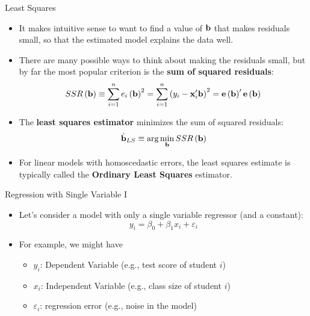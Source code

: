 \begin{frame}{Least Squares}
\begin{itemize}
	\item It makes intuitive sense to want to find a value of ${\bf b}$
	 that makes residuals small, so that the estimated model explains the data well.

	\smallskip
	\item There are many possible ways to think about making the residuals small, but
	by far the most popular criterion is the {\bf sum of squared residuals}:\[
		SSR\left({\bf b}\right) \equiv \sum_{i=1}^{n} e_i \left({\bf b}\right)^2  =  \sum_{i=1}^{n} \left(y_i - {\bf x}_i' {\bf b}\right)^{2} = {\bf e} \left({\bf b}\right) '  {\bf e} \left({\bf b}\right)
	\]

	\smallskip
	\item The {\bf least squares estimator} minimizes the sum of squared residuals:\[
		\hat{{\bf b}}_{LS} \equiv \arg \min_{{\bf b}} SSR\left({\bf b}\right) 
	\]

	\smallskip
	\item For linear models with homoscedastic errors, the least squares estimate is typically called the
	{\bf Ordinary Least Squares} estimator.

\end{itemize}
\end{frame}



\begin{frame}{Regression with Single Variable I}
	\begin{itemize}
	
	\item Let's consider a model with only a single variable regressor (and a constant):\[
	y_i = \beta_0 + \beta_1 x_i + \varepsilon_i
	\]

	\medskip
	\item For example, we might have 
	\begin{itemize}
		\item $y_i$: Dependent Variable (e.g., test score of student $i$)
		\item $x_i$: Independent Variable (e.g., class size of student $i$)
		\item $\varepsilon_i$: regression error (e.g., noise in the model)
	\end{itemize}

	\end{itemize}
\end{frame}


